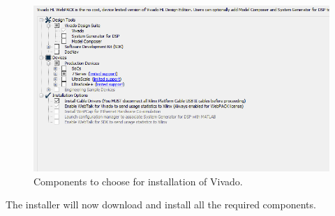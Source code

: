 \documentclass{article}
\begin{document}
\begin{figure}[h] \centering 
  \includegraphics[width=\linewidth]{./images/install_options.png}
  \caption{Components to choose for installation of Vivado.}
  \label{Fig:install_options}
\end{figure}
The installer will now download and install all the required components. 
\end{document}
